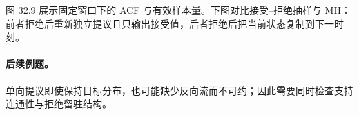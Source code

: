 \documentclass[UTF8,a4paper,11pt,openany]{ctexbook}
\begin{document}
\setcounter{page}{774}
\setcounter{chapter}{32}
\setcounter{figure}{9}
\pagestyle{headings}
图 32.9 展示固定窗口下的 ACF 与有效样本量。下图对比接受--拒绝抽样与 MH：前者拒绝后重新独立提议且只输出接受值，后者拒绝后把当前状态复制到下一时刻。

\paragraph{后续例题。}
单向提议即使保持目标分布，也可能缺少反向流而不可约；因此需要同时检查支持连通性与拒绝留驻结构。
\end{document}
